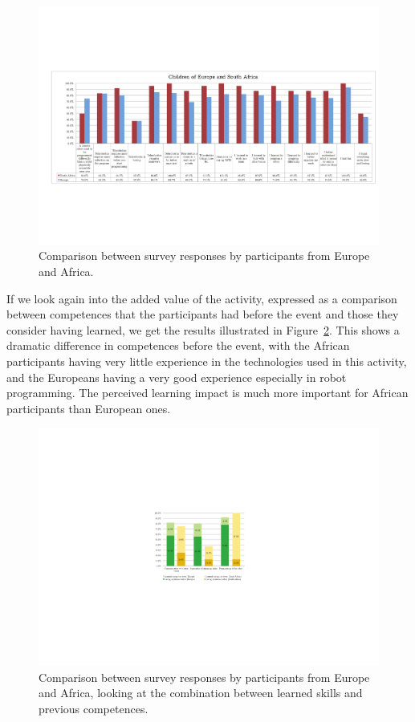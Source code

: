 \documentclass{intech-journal}
\begin{document}
\begin{figure}[ht]
 \centering
    \includegraphics[width=\columnwidth]{figures/all-eu-sa.pdf}
  \caption{Comparison between survey responses by participants from Europe and Africa.}
  \label{fig:EU-SA} 
\end{figure}

If we look again into the added value of the activity, expressed as a comparison between competences that the participants had before the event and those they consider having learned, we get the results illustrated in Figure~\ref{fig:EU-SA-learn}.
This shows a dramatic difference in competences before the event, with the African participants having very little experience in the technologies used in this activity, and the Europeans having a very good experience especially in robot programming. 
The perceived learning impact is much more important for African participants than European ones. 

\begin{figure}[ht]
 \centering
    \includegraphics[width=0.6\columnwidth]{figures/EU-SA-learned.pdf}
  \caption{Comparison between survey responses by participants from Europe and Africa, looking at the combination between learned skills and previous competences.}
  \label{fig:EU-SA-learn} 
\end{figure}
\end{document}
